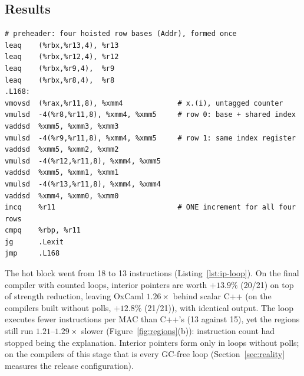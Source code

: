 \subsection{Results}
\begin{lstlisting}[language=asmX,caption={Inner loop with strength reduction and interior pointers (no polls): 13 instructions per 4 MACs. The final compiler with counted loops emits the same loop with polls on.},label=lst:ip-loop]
# preheader: four hoisted row bases (Addr), formed once
leaq    (%rbx,%r13,4), %r13
leaq    (%rbx,%r12,4), %r12
leaq    (%rbx,%r9,4),  %r9
leaq    (%rbx,%r8,4),  %r8
.L168:
vmovsd  (%rax,%r11,8), %xmm4             # x.(i), untagged counter
vmulsd  -4(%r8,%r11,8), %xmm4, %xmm5     # row 0: base + shared index
vaddsd  %xmm5, %xmm3, %xmm3
vmulsd  -4(%r9,%r11,8), %xmm4, %xmm5     # row 1: same index register
vaddsd  %xmm5, %xmm2, %xmm2
vmulsd  -4(%r12,%r11,8), %xmm4, %xmm5
vaddsd  %xmm5, %xmm1, %xmm1
vmulsd  -4(%r13,%r11,8), %xmm4, %xmm4
vaddsd  %xmm4, %xmm0, %xmm0
incq    %r11                             # ONE increment for all four rows
cmpq    %rbp, %r11
jg      .Lexit
jmp     .L168
\end{lstlisting}

The hot block went from 18 to 13 instructions (Listing~\ref{lst:ip-loop}).
On the final compiler with counted loops, interior pointers are worth
$+13.9\%$ (20/21) on top of strength reduction, leaving OxCaml
$1.26\times$ behind scalar C++ (on the compilers built without polls,
$+12.8\%$ (21/21)), with identical output. The loop
executes fewer instructions per MAC than C++'s (13 against 15), yet the
 regions still run $1.21$--$1.29\times$ slower
(Figure~\ref{fig:regions}(b)): instruction count had stopped being the
explanation. Interior pointers form only in loops without polls; on the
compilers of this stage that is every GC-free loop (Section~\ref{sec:reality}
measures the release configuration).
